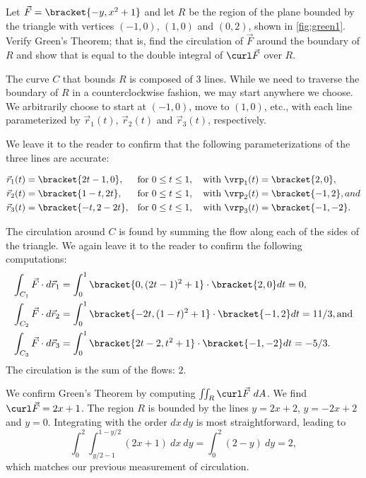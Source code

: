 {Let $\vec F =\bracket{-y,x^2+1}$ and let $R$ be the region of the plane bounded by the triangle with vertices $(-1,0)$, $(1,0)$ and $(0,2)$, shown in \autoref{fig:green1}. Verify Green's Theorem; that is, find the circulation of $\vec F$ around the boundary of $R$ and show that is equal to the double integral of $\curl \vec F$ over $R$.}
{The curve $C$ that bounds $R$ is composed of 3 lines. While we need to traverse the boundary of $R$ in a counterclockwise fashion, we may start anywhere we choose. We arbitrarily choose to start at $(-1,0)$, move to $(1,0)$, etc., with each line parameterized by $\vec r_1(t)$, $\vec r_2(t)$ and $\vec r_3(t)$, respectively.

We leave it to the reader to confirm that the following parameterizations of the three lines are accurate:

\begin{align*}
\vec r_1(t) &=\bracket{2t-1,0}, && \text{for }0\leq t\leq 1,\quad\text{with }\vrp_1(t) =\bracket{ 2,0},\\
\vec r_2(t) &=\bracket{1-t,2t}, && \text{for }0\leq t\leq 1,\quad\text{with }\vrp_2(t) =\bracket{ -1,2}, and\\
\vec r_3(t) &=\bracket{-t,2-2t}, && \text{for }0\leq t\leq 1,\quad\text{with } \vrp_3(t) =\bracket{ -1,-2}.
\end{align*}

The circulation around $C$ is found by summing the flow along each of the sides of the triangle. We again leave it to the reader to confirm the following computations:
\begin{align*}
\int_{C_1}\vec F\cdot d\vec r_1 &= \int_0^1\bracket{0,(2t-1)^2+1}\cdot\bracket{2,0}dt = 0,\\
\int_{C_2}\vec F\cdot d\vec r_2 &= \int_0^1\bracket{-2t,(1-t)^2+1}\cdot\bracket{-1,2}dt = 11/3, \text{and}\\
\int_{C_3}\vec F\cdot d\vec r_3 &= \int_0^1\bracket{2t-2,t^2+1}\cdot\bracket{-1,-2}dt = -5/3.
\end{align*}
The circulation is the sum of the flows: $2$.

We confirm Green's Theorem by computing $\iint_R \curl \vec F\ dA$. We find $\curl \vec F = 2x+1$. The region $R$ is bounded by the lines $y = 2x+2$, $y=-2x+2$ and $y=0$. Integrating with the order $dx\, dy$ is most straightforward, leading to
\[\int_0^2\int_{y/2-1}^{1-y/2} (2x+1)\ dx\ dy = \int_0^2 (2-y)\ dy = 2,\]
which matches our previous measurement of circulation.}

